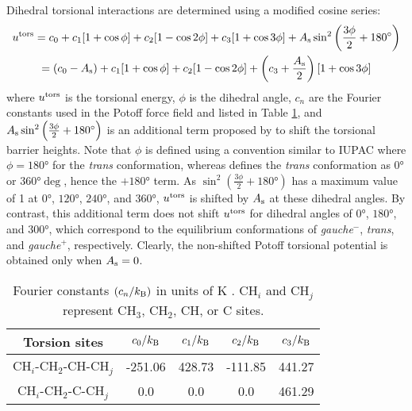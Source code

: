 \documentclass[preprint,review,12pt]{elsarticle}
\begin{document}
	Dihedral torsional interactions are determined using a modified cosine series:
	\begin{multline}
	u^{\rm tors} = c_0 + c_1 [1+\cos{\phi}] + c_2 [1-\cos{2\phi}] + c_3 [1+\cos{3\phi}] + A_{\rm s} \sin^2\left(\frac{3\phi}{2} + \ang{180}\right) \\ = (c_0 - A_{\rm s}) + c_1 [1+\cos{\phi}] + c_2 [1-\cos{2\phi}] + \left(c_3 + \frac{A_{\rm s}}{2}\right) [1+\cos{3\phi}]
	\end{multline}
	where $u^{\rm tors}$ is the torsional energy, $\phi$ is the dihedral angle, $c_n$ are the Fourier constants used in the Potoff force field and listed in Table \ref{tab:torsions}, and $A_{\rm s} \sin^2\left(\frac{3\phi}{2} + \ang{180}\right)$ is an additional term proposed by  to shift the torsional barrier heights. Note that $\phi$ is defined using a convention similar to IUPAC where $\phi = \ang{180}$ for the \textit{trans} conformation, whereas  defines the \textit{trans} conformation as $\ang{0}$ or $\ang{360} \deg$, hence the $+\ang{180}$ term. As $\sin^2\left(\frac{3\phi}{2} + \ang{180}\right)$ has a maximum value of 1 at $\ang{0}$, $\ang{120}$, $\ang{240}$, and $\ang{360}$, $u^{\rm tors}$ is shifted by $A_{\rm s}$ at these dihedral angles. By contrast, this additional term does not shift $u^{\rm tors}$ for dihedral angles of $\ang{0}$, $\ang{180}$, and $\ang{300}$, which correspond to the equilibrium conformations of \textit{gauche}$^-$, \textit{trans}, and \textit{gauche}$^+$, respectively. Clearly, the non-shifted Potoff torsional potential is obtained only when $A_{\rm s} = 0$. 
	
	\begin{table}[h!]
		\caption{Fourier constants $(c_n/k_{\rm B})$ in units of K \cite{Martin1999,Potoff_branched}. CH$_i$ and CH$_j$ represent CH$_3$, CH$_2$, CH, or C sites.} \label{tab:torsions}
		\begin{center}
			\begin{tabular}{|c|c|c|c|c|}
				\hline
				Torsion sites & $c_0/k_{\rm B}$ & $c_1/k_{\rm B}$ & $c_2/k_{\rm B}$ & $c_3/k_{\rm B}$ \\ \hline
				CH$_i$-CH$_2$-CH-CH$_j$ & -251.06 & 428.73 & -111.85 & 441.27 \\
				CH$_i$-CH$_2$-C-CH$_j$ & 0.0 & 0.0 & 0.0 & 461.29 \\
				\hline
			\end{tabular}
		\end{center} 
	\end{table}
\end{document}
